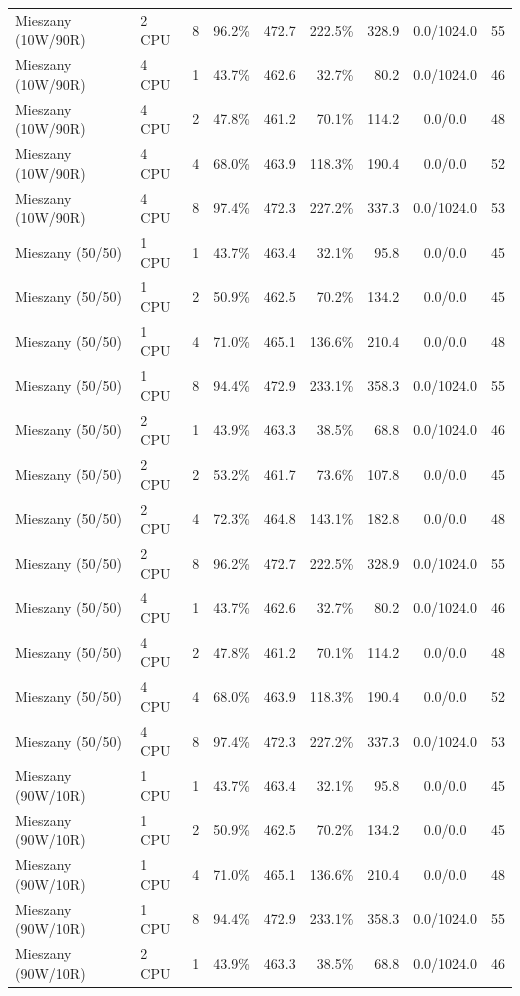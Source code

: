 \begin{table}[ht]
{\begin{tabular}{llcrrrrcc}
Mieszany (10W/90R) & 2 CPU & 8 & 96.2\% & 472.7 & 222.5\% & 328.9 & 0.0/1024.0 & 55 \\
Mieszany (10W/90R) & 4 CPU & 1 & 43.7\% & 462.6 & 32.7\% & 80.2 & 0.0/1024.0 & 46 \\
Mieszany (10W/90R) & 4 CPU & 2 & 47.8\% & 461.2 & 70.1\% & 114.2 & 0.0/0.0 & 48 \\
Mieszany (10W/90R) & 4 CPU & 4 & 68.0\% & 463.9 & 118.3\% & 190.4 & 0.0/0.0 & 52 \\
Mieszany (10W/90R) & 4 CPU & 8 & 97.4\% & 472.3 & 227.2\% & 337.3 & 0.0/1024.0 & 53 \\
Mieszany (50/50) & 1 CPU & 1 & 43.7\% & 463.4 & 32.1\% & 95.8 & 0.0/0.0 & 45 \\
Mieszany (50/50) & 1 CPU & 2 & 50.9\% & 462.5 & 70.2\% & 134.2 & 0.0/0.0 & 45 \\
Mieszany (50/50) & 1 CPU & 4 & 71.0\% & 465.1 & 136.6\% & 210.4 & 0.0/0.0 & 48 \\
Mieszany (50/50) & 1 CPU & 8 & 94.4\% & 472.9 & 233.1\% & 358.3 & 0.0/1024.0 & 55 \\
Mieszany (50/50) & 2 CPU & 1 & 43.9\% & 463.3 & 38.5\% & 68.8 & 0.0/1024.0 & 46 \\
Mieszany (50/50) & 2 CPU & 2 & 53.2\% & 461.7 & 73.6\% & 107.8 & 0.0/0.0 & 45 \\
Mieszany (50/50) & 2 CPU & 4 & 72.3\% & 464.8 & 143.1\% & 182.8 & 0.0/0.0 & 48 \\
Mieszany (50/50) & 2 CPU & 8 & 96.2\% & 472.7 & 222.5\% & 328.9 & 0.0/1024.0 & 55 \\
Mieszany (50/50) & 4 CPU & 1 & 43.7\% & 462.6 & 32.7\% & 80.2 & 0.0/1024.0 & 46 \\
Mieszany (50/50) & 4 CPU & 2 & 47.8\% & 461.2 & 70.1\% & 114.2 & 0.0/0.0 & 48 \\
Mieszany (50/50) & 4 CPU & 4 & 68.0\% & 463.9 & 118.3\% & 190.4 & 0.0/0.0 & 52 \\
Mieszany (50/50) & 4 CPU & 8 & 97.4\% & 472.3 & 227.2\% & 337.3 & 0.0/1024.0 & 53 \\
Mieszany (90W/10R) & 1 CPU & 1 & 43.7\% & 463.4 & 32.1\% & 95.8 & 0.0/0.0 & 45 \\
Mieszany (90W/10R) & 1 CPU & 2 & 50.9\% & 462.5 & 70.2\% & 134.2 & 0.0/0.0 & 45 \\
Mieszany (90W/10R) & 1 CPU & 4 & 71.0\% & 465.1 & 136.6\% & 210.4 & 0.0/0.0 & 48 \\
Mieszany (90W/10R) & 1 CPU & 8 & 94.4\% & 472.9 & 233.1\% & 358.3 & 0.0/1024.0 & 55 \\
Mieszany (90W/10R) & 2 CPU & 1 & 43.9\% & 463.3 & 38.5\% & 68.8 & 0.0/1024.0 & 46 \\

\end{tabular}}
\end{table}
